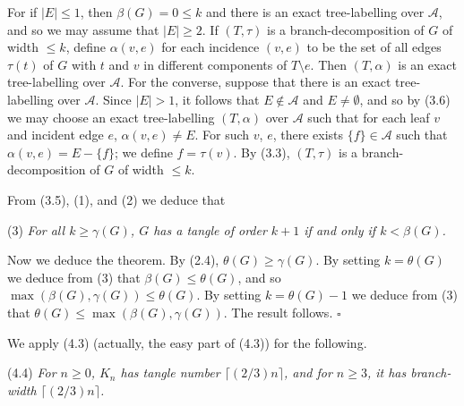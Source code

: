 For if $|E| \le 1$, then $\beta(G) = 0 \le k$ and there is an exact tree-labelling over $\mathscr{A}$, and so we may assume that $|E| \ge 2$. If $(T, \tau)$ is a branch-decomposition of $G$ of width $\le k$, define $\alpha(v, e)$ for each incidence $(v, e)$ to be the set of all edges $\tau(t)$ of $G$ with $t$ and $v$ in different components of $T \setminus e$. Then $(T, \alpha)$ is an exact tree-labelling over $\mathscr{A}$. For the converse, suppose that there is an exact tree-labelling over $\mathscr{A}$. Since $|E| > 1$, it follows that $E \notin \mathscr{A}$ and $E \ne \emptyset$, and so by (3.6) we may choose an exact tree-labelling $(T, \alpha)$ over $\mathscr{A}$ such that for each leaf $v$ and incident edge $e$, $\alpha(v, e) \ne E$. For such $v$, $e$, there exists $\{f\} \in \mathscr{A}$ such that $\alpha(v, e) = E - \{f\}$; we define $f = \tau(v)$. By (3.3), $(T, \tau)$ is a branch-decomposition of $G$ of width $\le k$.

From (3.5), (1), and (2) we deduce that

\hspace*{12pt}(3) \textit{For all $k \ge \gamma(G)$, $G$ has a tangle of order $k + 1$ if and only if $k < \beta(G)$.}

Now we deduce the theorem. By (2.4), $\theta(G) \ge \gamma(G)$. By setting $k = \theta(G)$ we deduce from (3) that $\beta(G) \le \theta(G)$, and so $\max(\beta(G), \gamma(G)) \le \theta(G)$. By setting $k = \theta(G) - 1$ we deduce from (3) that $\theta(G) \le \max(\beta(G), \gamma(G))$. The result follows. $\square$

We apply (4.3) (actually, the easy part of (4.3)) for the following.

\stmt
(4.4) \textit{For $n \ge 0$, $K_n$ has tangle number $\lceil(2/3) n\rceil$, and for $n \ge 3$, it has branch-width $\lceil(2/3) n\rceil$.}

